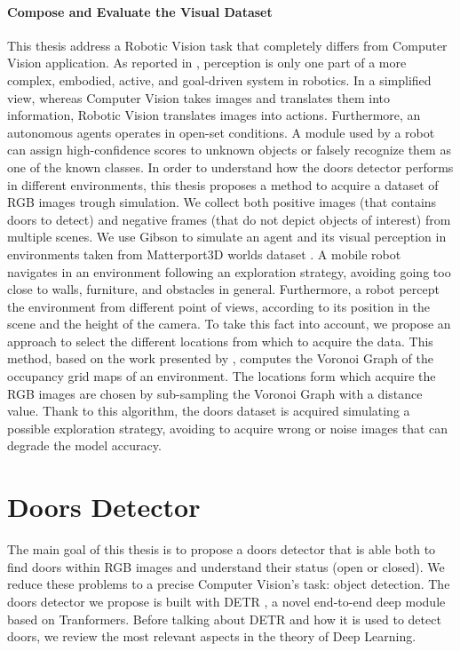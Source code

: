 \paragraph{Compose and Evaluate the Visual Dataset}
This thesis address a Robotic Vision task that completely differs from Computer Vision application. As reported in \cite{surveydeeplimits}, perception is only one part of a more complex, embodied, active, and goal-driven system in robotics.
In a simplified view, whereas Computer Vision takes images and translates them into information, Robotic Vision translates images into actions. Furthermore, an autonomous agents operates in open-set conditions. A module used by a robot can assign high-confidence scores to unknown objects or falsely recognize them as one of the known classes. In order to understand how the doors detector performs in different environments, this thesis proposes a method to acquire a dataset of RGB images trough simulation. We collect both positive images (that contains doors to detect) and negative frames (that do not depict objects of interest) from multiple scenes. We use Gibson \cite{gibson} to simulate an agent and its visual perception in environments taken from Matterport3D worlds dataset \cite{matterport}. A mobile robot navigates in an environment following an exploration strategy, avoiding going too close to walls, furniture, and obstacles in general. Furthermore, a robot percept the environment from different point of views, according to its position in the scene and the height of the camera. To take this fact into account, we propose an approach to select the different locations from which to acquire the data. This method, based on the work presented by \citeauthor{segmentationsurvey} \cite{segmentationsurvey}, computes the Voronoi Graph of the occupancy grid maps of an environment. The locations form which acquire the RGB images are chosen by sub-sampling the Voronoi Graph with a distance value. Thank to this algorithm, the doors dataset is acquired simulating a possible exploration strategy, avoiding to acquire wrong or noise images that can degrade the model accuracy.


\section{Doors Detector}

The main goal of this thesis is to propose a doors detector that is able both to find doors within RGB images and understand their status (open or closed). We reduce these problems to a precise Computer Vision's task: object detection. The doors detector we propose is built with DETR \cite{detr}, a novel end-to-end deep module based on Tranformers. Before talking about DETR and how it is used to detect doors, we review the most relevant aspects in the theory of Deep Learning.

